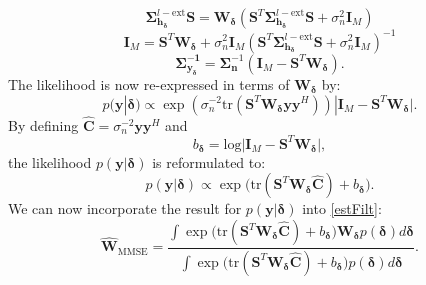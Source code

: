 \documentclass[12pt, draftclsnofoot, onecolumn]{IEEEtran}
\begin{document}
\begin{equation}
       \mathbf{\Sigma}_\mathbf{h_{\boldsymbol{\delta}}}^{l-\text{ext}} \mathbf{S}  = {\mathbf{W}}_{\boldsymbol{\delta}} (\mathbf{S}^T \mathbf{\Sigma}_\mathbf{h_{\boldsymbol{\delta}}}^{l-\text{ext}} \mathbf{S} + \sigma_n^2\mathbf{I}_M)
\end{equation}
\begin{equation}
     \mathbf{I}_M  = \mathbf{S}^T {\mathbf{W}}_{\boldsymbol{\delta}} + \sigma_n^2\mathbf{I}_M (\mathbf{S}^T \mathbf{\Sigma}_\mathbf{h_{\boldsymbol{\delta}}}^{l-\text{ext}} \mathbf{S} + \sigma_n^2\mathbf{I}_M)^{-1}
\end{equation}
\begin{equation}
     \mathbf{\Sigma_{y_{\boldsymbol{\delta}}}^{-1}} = \mathbf{\Sigma}_\mathbf{n}^{-1}  (\mathbf{I}_M - \mathbf{S}^T {\mathbf{W}}_{\boldsymbol{\delta}}).
\end{equation}
The likelihood is now re-expressed in terms of ${\mathbf{W}}_{\boldsymbol{\delta}}$ by:
\begin{equation}
  p(\mathbf{y}|{\boldsymbol{\delta}}) \propto \exp{(\sigma_n^{-2}\mathrm{tr}( \mathbf{S}^T {\mathbf{W}}_{\boldsymbol{\delta}} \mathbf{y}\mathbf{y}^H))}|{\mathbf{I}_M - \mathbf{S}^T {\mathbf{W}}_{\boldsymbol{\delta}}|}.
\end{equation}
By defining $\hat{\mathbf{C}} = \sigma_n^{-2}\mathbf{y}\mathbf{y}^H$ and 
\begin{equation}
      b_{\boldsymbol{\delta}}
      = \mathrm{log}|{\mathbf{I}_M - \mathbf{S}^T {\mathbf{W}}_{\boldsymbol{\delta}}|},
      \label{biasTerm}
\end{equation}
the likelihood $p(\mathbf{y}|{\boldsymbol{\delta}})$ is reformulated to:
\begin{equation}
  p(\mathbf{y}|{\boldsymbol{\delta}}) \propto \exp{(\mathrm{tr}( \mathbf{S}^T {\mathbf{W}}_{\boldsymbol{\delta}} \hat{\mathbf{C}})}+b_{\boldsymbol{\delta}}).
\end{equation}
We can now incorporate the result for $p(\mathbf{y}|{\boldsymbol{\delta}})$ into \eqref{estFilt}:
\begin{equation}
\hat{\mathbf{W}}_\text{MMSE} =  \dfrac{\int \exp{(\mathrm{tr}( \mathbf{S}^T {\mathbf{W}}_{\boldsymbol{\delta}} \hat{\mathbf{C}})}+b_{\boldsymbol{\delta}}) {\mathbf{W}}_{\boldsymbol{\delta}} p({\boldsymbol{\delta}})  d{\boldsymbol{\delta}} } { \int \exp{(\mathrm{tr}( \mathbf{S}^T {\mathbf{W}}_{\boldsymbol{\delta}} \hat{\mathbf{C}})}+b_{\boldsymbol{\delta}}) p( {\boldsymbol{\delta}}) d{\boldsymbol{\delta}} }.
\end{equation}
\end{document}
